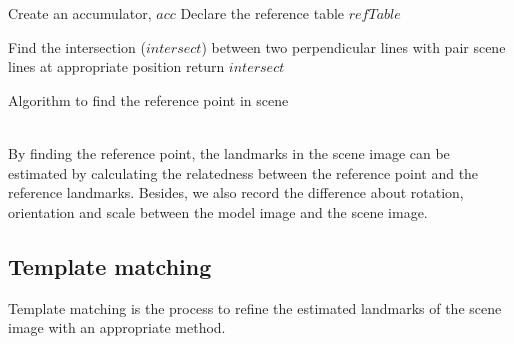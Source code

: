 \begin{algorithm}[H]
\Indm 
{}
\Indp
Create an accumulator, $acc$\;
Declare the reference table $refTable$ \;

Find the intersection ($intersect$) between two perpendicular lines with pair scene lines at appropriate position\;
return $intersect$ \;
\caption{Algorithm to find the reference point in scene}
\end{algorithm}~\\[0.2cm]
By finding the reference point, the landmarks in the scene image can be estimated by calculating the relatedness between the reference point and the reference landmarks. Besides, we also record the difference about rotation, orientation and scale between the model image and the scene image.
\subsection{Template matching}
Template matching is the process to refine the estimated landmarks of the scene image with an appropriate method.
